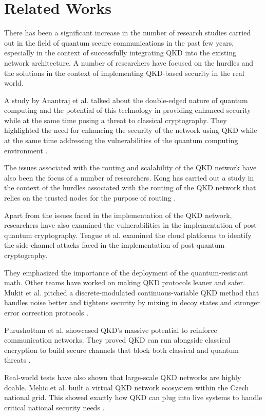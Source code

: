 \documentclass[conference]{IEEEtran}
\begin{document}
\section{Related Works}

There has been a significant increase in the number of research studies carried out in the field of quantum secure communications in the past few years, especially in the context of successfully integrating QKD into the existing network architecture. A number of researchers have focused on the hurdles and the solutions in the context of implementing QKD-based security in the real world.

A study by Anantraj et al. talked about the double-edged nature of quantum computing and the potential of this technology in providing enhanced security while at the same time posing a threat to classical cryptography. They highlighted the need for enhancing the security of the network using QKD while at the same time addressing the vulnerabilities of the quantum computing environment \cite{b1}.

The issues associated with the routing and scalability of the QKD network have also been the focus of a number of researchers. Kong has carried out a study in the context of the hurdles associated with the routing of the QKD network that relies on the trusted nodes for the purpose of routing \cite{b2}.

Apart from the issues faced in the implementation of the QKD network, researchers have also examined the vulnerabilities in the implementation of post-quantum cryptography. Teague et al. examined the cloud platforms to identify the side-channel attacks faced in the implementation of post-quantum cryptography. \cite{b3}

They emphasized the importance of the deployment of the quantum-resistant math. 
Other teams have worked on making QKD protocols leaner and safer. Mukit et al. pitched a discrete-modulated continuous-variable QKD method that handles noise better and tightens security by mixing in decoy states and stronger error correction protocols \cite{b4}.
 
Purushottam et al. showcased QKD's massive potential to reinforce communication networks. They proved QKD can run alongside classical encryption to build secure channels that block both classical and quantum threats \cite{b5}.

Real-world tests have also shown that large-scale QKD networks are highly doable. Mehic et al. built a virtual QKD network ecosystem within the Czech national grid. This showed exactly how QKD can plug into live systems to handle critical national security needs \cite{b6}.
\end{document}
